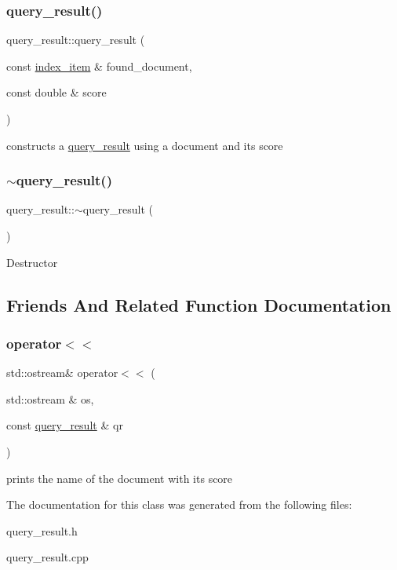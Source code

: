 \subsubsection{\texorpdfstring{query\+\_\+result()}{query\_result()}}
{\footnotesize\ttfamily query\+\_\+result\+::query\+\_\+result (\begin{DoxyParamCaption}\item[{const \hyperlink{classindex__item}{index\+\_\+item} \&}]{found\+\_\+document,  }\item[{const double \&}]{score }\end{DoxyParamCaption})}

constructs a \hyperlink{classquery__result}{query\+\_\+result} using a document and its score \mbox{\label{classquery__result_a85eee76ed372ad28ab7347053633714a}} 
\subsubsection{\texorpdfstring{$\sim$query\+\_\+result()}{~query\_result()}}
{\footnotesize\ttfamily query\+\_\+result\+::$\sim$query\+\_\+result (\begin{DoxyParamCaption}{ }\end{DoxyParamCaption})}

Destructor 

\subsection{Friends And Related Function Documentation}
\mbox{\label{classquery__result_aa97ddcf5d38eaf8c7160b9fe609170f5}} 
\subsubsection{\texorpdfstring{operator$<$$<$}{operator<<}}
{\footnotesize\ttfamily std\+::ostream\& operator$<$$<$ (\begin{DoxyParamCaption}\item[{std\+::ostream \&}]{os,  }\item[{const \hyperlink{classquery__result}{query\+\_\+result} \&}]{qr }\end{DoxyParamCaption})\hspace{0.3cm}{\ttfamily [friend]}}

prints the name of the document with its score 

The documentation for this class was generated from the following files\+:\begin{DoxyCompactItemize}
\item 
query\+\_\+result.\+h\item 
query\+\_\+result.\+cpp\end{DoxyCompactItemize}
